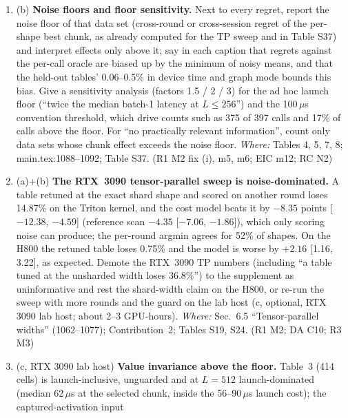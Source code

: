 \documentclass[11pt]{article}
\begin{document}
\begin{enumerate}[label=M5\alph*.]
  \item (b) \textbf{Noise floors and floor sensitivity.} Next to every regret,
        report the noise floor of that data set (cross-round or cross-session
        regret of the per-shape best chunk, as already computed for the TP
        sweep and in Table S37) and interpret effects only above it; say in
        each caption that regrets against the per-call oracle are biased up by
        the minimum of noisy means, and that the held-out tables' 0.06--0.5\%
        in device time and graph mode bounds this bias. Give a sensitivity
        analysis (factors 1.5 / 2 / 3) for the ad hoc launch floor (``twice the
        median batch-1 latency at $L\le256$'') and the 100\,$\mu$s convention
        threshold, which drive counts such as 375 of 397 calls and 17\% of
        calls above the floor. For ``no practically relevant information'',
        count only data sets whose chunk effect exceeds the noise floor.
        \emph{Where:} Tables 4, 5, 7, 8; main.tex:1088--1092; Table S37. (R1
        M2 fix (i), m5, m6; EIC m12; RC N2)
  \item (a)+(b) \textbf{The RTX~3090 tensor-parallel sweep is
        noise-dominated.} A table retuned at the exact shard shape and scored
        on another round loses 14.87\% on the Triton kernel, and the cost
        model beats it by $-8.35$ points [$-12.38$, $-4.59$] (reference scan
        $-4.35$ [$-7.06$, $-1.86$]), which only scoring noise can produce; the
        per-round argmin agrees for 52\% of shapes. On the H800 the retuned
        table loses 0.75\% and the model is worse by $+2.16$ [1.16, 3.22], as
        expected. Demote the RTX~3090 TP numbers (including ``a table tuned at
        the unsharded width loses 36.8\%'') to the supplement as
        uninformative and rest the shard-width claim on the H800, or re-run
        the sweep with more rounds and the guard on the lab host (c, optional,
        RTX 3090 lab host; about 2--3 GPU-hours). \emph{Where:} Sec.~6.5
        ``Tensor-parallel widths'' (1062--1077); Contribution~2; Tables S19,
        S24. (R1 M2; DA C10; R3 M3)
  \item (c, RTX 3090 lab host) \textbf{Value invariance above the floor.}
        Table~3 (414 cells) is launch-inclusive, unguarded and at
        $L=512$ launch-dominated (median 62\,$\mu$s at the selected chunk,
        inside the 56--90\,$\mu$s launch cost); the captured-activation input

\end{enumerate}
\end{document}
